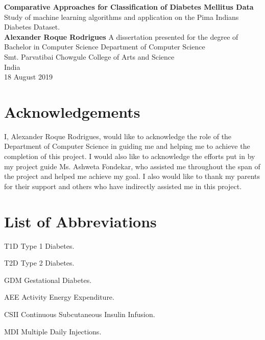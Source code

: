 \documentclass[12pt]{article}
\begin{document}
\begin{titlepage}
    \begin{center}
        \vspace*{1cm} 
        \Huge
        \textbf{Comparative Approaches for Classification of Diabetes Mellitus Data} 
        \vspace{0.5cm}
        \normalsize
        \vspace{0cm}
        \\
        Study of machine learning algorithms and application on the Pima Indians Diabetes Dataset. 
        \vspace{1.5cm} 
        \\
        \textbf{Alexander Roque Rodrigues} 
        \vfill 
        A dissertation presented for the degree of\\
        Bachelor in Computer Science 
        \vspace{0.8cm}
        \Large        
        Department of Computer Science\\        
        Smt. Parvatibai Chowgule College of Arts and Science\\
        India\\
        18 August 2019 
    \end{center}
\end{titlepage}
\Huge
\newpage
\huge
\normalsize
\tableofcontents

\newpage
\part{Acknowledgements}
I, Alexander Roque Rodrigues, would like to acknowledge the role of the Department of Computer Science in guiding me and helping me to achieve the completion of this project. I would also like to acknowledge the efforts put in by my project guide Ms. Ashweta Fondekar, who assisted me throughout the span of the project and helped me achieve my goal. I also would like to thank my parents for their support and others who have indirectly assisted me in this project.


\newpage
{}
 
\part{List of Abbreviations}
\begin{abbrv}
 
\item[T1D]			Type 1 Diabetes.
\item[T2D]			Type 2 Diabetes.
\item[GDM]			Gestational Diabetes.
\item[AEE]			Activity Energy Expenditure.
\item[CSII] 		Continuous Subcutaneous Insulin Infusion.
\item[MDI] 			Multiple Daily Injections.

\end{abbrv}
\end{document}
